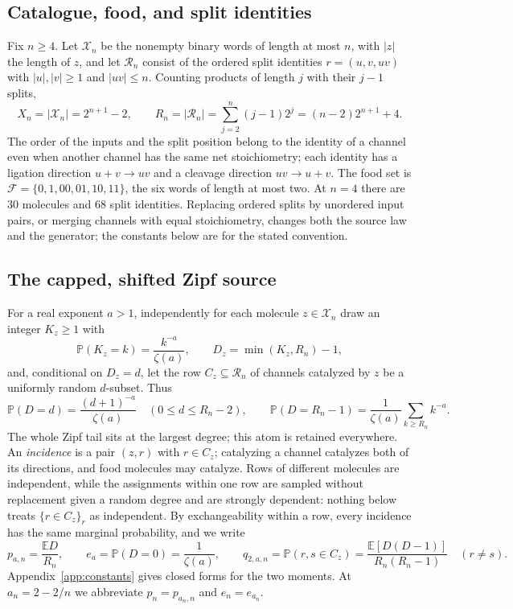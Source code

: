 \documentclass[11pt,letterpaper]{article}
\theoremstyle{plain}
\theoremstyle{definition}
\theoremstyle{remark}
\numberwithin{equation}{section}
\newcommand{\PP}{\mathbb P}
\newcommand{\EE}{\mathbb E}
\newcommand{\cX}{\mathcal X}
\newcommand{\cR}{\mathcal R}
\newcommand{\cF}{\mathcal F}
\begin{document}
\subsection{Catalogue, food, and split identities}
Fix $n\ge4$. Let $\cX_n$ be the nonempty binary words of length at most $n$, with $|z|$ the length of $z$, and let $\cR_n$ consist of the ordered split identities $r=(u,v,uv)$ with $|u|,|v|\ge1$ and $|uv|\le n$. Counting products of length $j$ with their $j-1$ splits,
\begin{equation}\label{eq:counts}
 X_n=|\cX_n|=2^{n+1}-2,\qquad R_n=|\cR_n|=\sum_{j=2}^n(j-1)2^j=(n-2)2^{n+1}+4 .
\end{equation}
The order of the inputs and the split position belong to the identity of a channel even when another channel has the same net stoichiometry; each identity has a ligation direction $u+v\to uv$ and a cleavage direction $uv\to u+v$. The food set is $\cF=\{0,1,00,01,10,11\}$, the six words of length at most two. At $n=4$ there are $30$ molecules and $68$ split identities. Replacing ordered splits by unordered input pairs, or merging channels with equal stoichiometry, changes both the source law and the generator; the constants below are for the stated convention.

\subsection{The capped, shifted Zipf source}\label{sec:source}
For a real exponent $a>1$, independently for each molecule $z\in\cX_n$ draw an integer $K_z\ge1$ with
\begin{equation}\label{eq:zipf}
 \PP(K_z=k)=\frac{k^{-a}}{\zeta(a)},\qquad D_z=\min(K_z,R_n)-1,
\end{equation}
and, conditional on $D_z=d$, let the row $C_z\subseteq\cR_n$ of channels catalyzed by $z$ be a uniformly random $d$-subset. Thus
\begin{equation}\label{eq:degreelaw}
 \PP(D=d)=\frac{(d+1)^{-a}}{\zeta(a)}\quad(0\le d\le R_n-2),\qquad
 \PP(D=R_n-1)=\frac1{\zeta(a)}\sum_{k\ge R_n}k^{-a}.
\end{equation}
The whole Zipf tail sits at the largest degree; this atom is retained everywhere. An \emph{incidence} is a pair $(z,r)$ with $r\in C_z$; catalyzing a channel catalyzes both of its directions, and food molecules may catalyze. Rows of different molecules are independent, while the assignments within one row are sampled without replacement given a random degree and are strongly dependent: nothing below treats $\{r\in C_z\}_r$ as independent. By exchangeability within a row, every incidence has the same marginal probability, and we write
\begin{equation}\label{eq:marginal}
 p_{a,n}=\frac{\EE D}{R_n},\qquad e_a=\PP(D=0)=\frac1{\zeta(a)},\qquad
 q_{2,a,n}=\PP(r,s\in C_z)=\frac{\EE[D(D-1)]}{R_n(R_n-1)}\quad(r\ne s).
\end{equation}
Appendix~\ref{app:constants} gives closed forms for the two moments. At $a_n=2-2/n$ we abbreviate $p_n=p_{a_n,n}$ and $e_n=e_{a_n}$.
\end{document}
